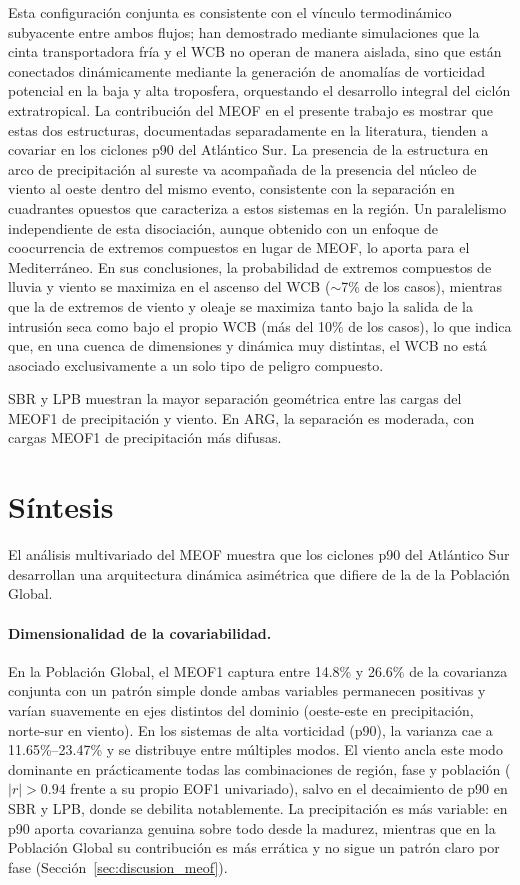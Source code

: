 Esta configuración conjunta es consistente con el vínculo termodinámico subyacente entre ambos flujos; \citet{schemm2014linkage} han demostrado mediante simulaciones que la cinta transportadora fría y el WCB no operan de manera aislada, sino que están conectados dinámicamente mediante la generación de anomalías de vorticidad potencial en la baja y alta troposfera, orquestando el desarrollo integral del ciclón extratropical.
La contribución del MEOF en el presente trabajo es mostrar que estas dos estructuras, documentadas separadamente en la literatura, tienden a covariar en los ciclones p90 del Atlántico Sur. La presencia de la estructura en arco de precipitación al sureste va acompañada de la presencia del núcleo de viento al oeste dentro del mismo evento, consistente con la separación en cuadrantes opuestos que caracteriza a estos sistemas en la región.
Un paralelismo independiente de esta disociación, aunque obtenido con un enfoque de coocurrencia de extremos compuestos en lugar de MEOF, lo aporta \citet{portal2024linking} para el Mediterráneo. En sus conclusiones, la probabilidad de extremos compuestos de lluvia y viento se maximiza en el ascenso del WCB (${\sim}$7\% de los casos), mientras que la de extremos de viento y oleaje se maximiza tanto bajo la salida de la intrusión seca como bajo el propio WCB (más del 10\% de los casos), lo que indica que, en una cuenca de dimensiones y dinámica muy distintas, el WCB no está asociado exclusivamente a un solo tipo de peligro compuesto.

SBR y LPB muestran la mayor separación geométrica entre las cargas del MEOF1 de precipitación y viento. En ARG, la separación es moderada, con cargas MEOF1 de precipitación más difusas.

\section{Síntesis}
\label{sec:sintesis_meof}

El análisis multivariado del MEOF muestra que los ciclones p90 del Atlántico Sur desarrollan una arquitectura dinámica asimétrica que difiere de la de la Población Global.

\paragraph{Dimensionalidad de la covariabilidad.}
En la Población Global, el MEOF1 captura entre 14.8\% y 26.6\% de la covarianza conjunta con un patrón simple donde ambas variables permanecen positivas y varían suavemente en ejes distintos del dominio (oeste-este en precipitación, norte-sur en viento). En los sistemas de alta vorticidad (p90), la varianza cae a 11.65\%--23.47\% y se distribuye entre múltiples modos. El viento ancla este modo dominante en prácticamente todas las combinaciones de región, fase y población ($|r|>0.94$ frente a su propio EOF1 univariado), salvo en el decaimiento de p90 en SBR y LPB, donde se debilita notablemente. La precipitación es más variable: en p90 aporta covarianza genuina sobre todo desde la madurez, mientras que en la Población Global su contribución es más errática y no sigue un patrón claro por fase (Sección~\ref{sec:discusion_meof}).

